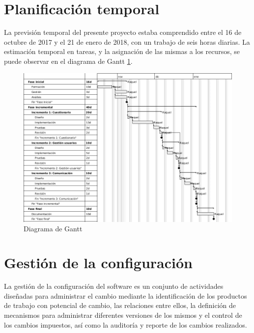 \section{Planificación temporal}
La previsión temporal del presente proyecto estaba comprendido entre el 16 de octubre de 2017 y el 21 de enero de 2018, con un trabajo de seis horas diarias. La estimación temporal en tareas, y la asignación de las mismas a los recursos, se puede observar en el diagrama de Gantt \ref{fig:gantt}.

\begin{landscape}

\begin{figure}[htbp] 
    \centering
    \includegraphics[height=\textwidth,keepaspectratio]{figuras/gantt_v2_en.png}
    \caption{Diagrama de Gantt}
    \label{fig:gantt}
\end{figure}	

\end{landscape}


\section{Gestión de la configuración}
La gestión de la configuración del software es un conjunto de actividades diseñadas para administrar el cambio mediante la identificación de los productos de trabajo con potencial de cambio, las relaciones entre ellos, la definición de mecanismos para administrar diferentes versiones de los mismos y el control de los cambios impuestos, así como la auditoría y reporte de los cambios realizados\cite{pressman}.

